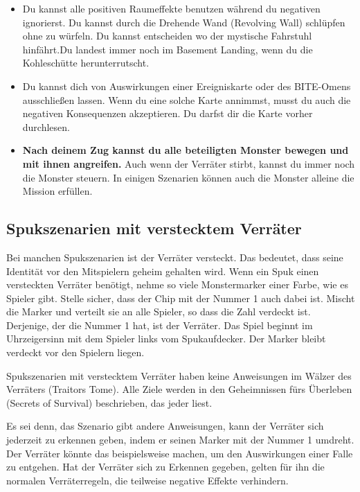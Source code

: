   \begin{itemize}
    \item Du kannst alle positiven Raumeffekte benutzen während du negativen ignorierst. Du kannst durch die Drehende Wand (Revolving Wall) schlüpfen ohne zu würfeln. Du kannst entscheiden wo der mystische Fahrstuhl hinfährt.Du landest immer noch im Basement Landing, wenn du die Kohleschütte herunterrutscht.
    \item Du kannst dich von Auswirkungen einer Ereigniskarte oder des BITE-Omens ausschließen lassen. Wenn du eine solche Karte annimmst, musst du auch die negativen Konsequenzen akzeptieren. Du darfst dir die Karte vorher durchlesen.
    \item \textbf{Nach deinem Zug kannst du alle beteiligten Monster bewegen und mit ihnen angreifen.} Auch wenn der Verräter stirbt, kannst du immer noch die Monster steuern. In einigen Szenarien können auch die Monster alleine die Mission erfüllen.
  \end{itemize}

\subsection{Spukszenarien mit verstecktem Verräter}
\label{kap:rule:hiddentraitor}

Bei manchen Spukszenarien ist der Verräter versteckt. Das bedeutet, dass seine Identität vor den Mitspielern geheim gehalten wird. Wenn ein Spuk einen versteckten Verräter benötigt, nehme so viele Monstermarker einer Farbe, wie es Spieler gibt. Stelle sicher, dass der Chip mit der Nummer 1 auch dabei ist. Mischt die Marker und verteilt sie an alle Spieler, so dass die Zahl verdeckt ist. Derjenige, der die Nummer 1 hat, ist der Verräter. Das Spiel beginnt im Uhrzeigersinn mit dem Spieler links vom Spukaufdecker. Der Marker bleibt verdeckt vor den Spielern liegen.

Spukszenarien mit verstecktem Verräter haben keine Anweisungen im Wälzer des Verräters (Traitors Tome). Alle Ziele werden in den Geheimnissen fürs Überleben (Secrets of Survival) beschrieben, das jeder liest.

Es sei denn, das Szenario gibt andere Anweisungen, kann der Verräter sich jederzeit zu erkennen geben, indem er seinen Marker mit der Nummer 1 umdreht. Der Verräter könnte das beispielsweise machen, um den Auswirkungen einer Falle zu entgehen. Hat der Verräter sich zu Erkennen gegeben, gelten für ihn die normalen Verräterregeln, die teilweise negative Effekte verhindern.

